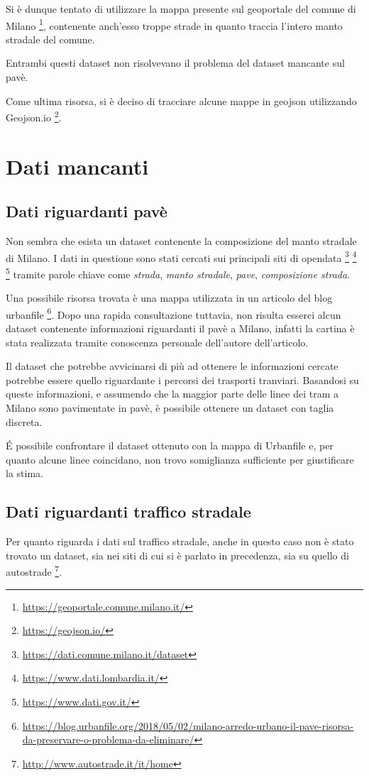 \documentclass[a4paper]{report}
\begin{document}
Si è dunque tentato di utilizzare la mappa presente sul geoportale del comune di Milano
\footnote{\url{https://geoportale.comune.milano.it/}}, 
contenente anch'esso troppe strade in quanto traccia l'intero manto stradale del comune.

Entrambi questi dataset non risolvevano il problema del dataset mancante sul pavè.

Come ultima risorsa, si è deciso di tracciare alcune mappe in geojson utilizzando Geojson.io
\footnote{\url{https://geojson.io/}}.

\section{Dati mancanti}

\subsection{Dati riguardanti pavè}
Non sembra che esista un dataset contenente la composizione del manto stradale di Milano.
I dati in questione sono stati cercati sui principali siti di opendata
\footnote{\url{https://dati.comune.milano.it/dataset}}
\footnote{\url{https://www.dati.lombardia.it/}}
\footnote{\url{https://www.dati.gov.it/}}
tramite parole chiave come \textit{strada}, \textit{manto stradale}, \textit{pave}, 
\textit{composizione strada}.

Una possibile risorsa trovata è una mappa utilizzata in un articolo del blog urbanfile
\footnote{\url{https://blog.urbanfile.org/2018/05/02/milano-arredo-urbano-il-pave-risorsa-da-preservare-o-problema-da-eliminare/}}.
Dopo una rapida consultazione tuttavia, non risulta esserci alcun dataset contenente informazioni 
riguardanti il pavè a Milano, infatti la cartina è stata realizzata tramite conoscenza personale dell'autore dell'articolo.

Il dataset che potrebbe avvicinarsi di più ad ottenere le informazioni cercate potrebbe essere 
quello riguardante i percorsi dei trasporti tranviari. Basandosi su queste informazioni, e assumendo che 
la maggior parte delle linee dei tram a Milano sono pavimentate in pavè, è possibile ottenere un dataset con taglia discreta.

\'E possibile confrontare il dataset ottenuto con la mappa di Urbanfile e, 
per quanto alcune linee coincidano, non trovo somiglianza sufficiente per giustificare la stima.

\subsection{Dati riguardanti traffico stradale}
Per quanto riguarda i dati sul traffico stradale, anche in questo caso non è stato trovato un 
dataset, sia nei siti di cui si è parlato in precedenza, sia su quello di autostrade
\footnote{\url{http://www.autostrade.it/it/home}}.
\end{document}
